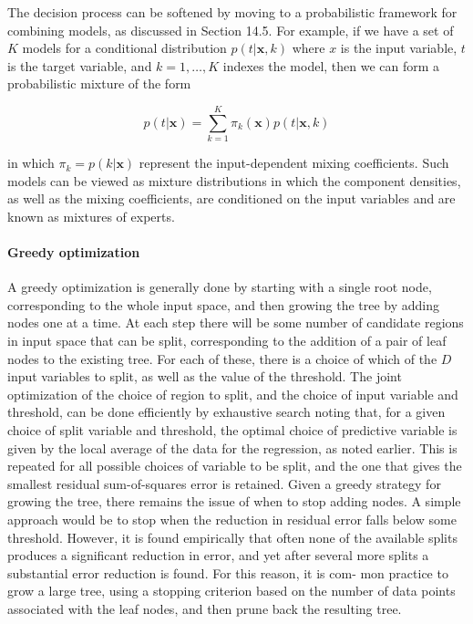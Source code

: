 \documentclass[final, paper=letter,5p,times,twocolumn]{elsarticle}
\begin{document}
The decision process can be softened by moving to a probabilistic framework for combining models, as discussed in Section 14.5. For example, if we have a set of $K$ models for a conditional distribution $p(t|\bm{x}, k)$ where $x$ is the input variable, $t$ is the target variable, and $k = 1, \dots , K$ indexes the model, then we can form a probabilistic mixture of the form

$$
p(t|\bm{x}) = \sum_{k=1}^{K} \pi_{k}(\bm{x})p(t|\bm{x},k)
$$

in which $ \pi_{k} = p(k|\bm{x})$ represent the input-dependent mixing coefficients. Such models can be viewed as mixture distributions in which the component densities, as well as the mixing coefficients, are conditioned on the input variables and are known as mixtures of experts. 

\paragraph{Greedy optimization}{A greedy optimization is generally done by starting with a single root node, corresponding to the whole input space, and then growing the tree by adding nodes one at a time. At each step there will be some number of candidate regions in input space that can be split, corresponding to the addition of a pair of leaf nodes to the existing tree. For each of these, there is a choice of which of the $D$ input variables to split, as well as the value of the threshold. The joint optimization of the choice of region to split, and the choice of input variable and threshold, can be done efficiently by exhaustive search noting that, for a given choice of split variable and threshold, the optimal choice of predictive variable is given by the local average of the data for the regression, as noted earlier. This is repeated for all possible choices of variable to be split, and the one that gives the smallest residual sum-of-squares error is retained.
Given a greedy strategy for growing the tree, there remains the issue of when to stop adding nodes. A simple approach would be to stop when the reduction in residual error falls below some threshold. However, it is found empirically that often none of the available splits produces a significant reduction in error, and yet after several more splits a substantial error reduction is found. For this reason, it is com- mon practice to grow a large tree, using a stopping criterion based on the number of data points associated with the leaf nodes, and then prune back the resulting tree.}
\end{document}
